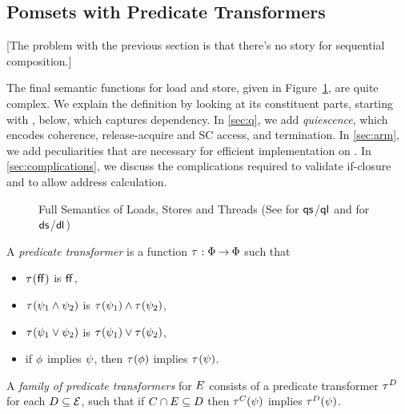 \subsection{Pomsets with Predicate Transformers}

[The problem with the previous section is that there's no story for
sequential composition.]

The final semantic functions for load and store, given in
Figure~\ref{fig:full}, are quite complex.  We explain the definition by
looking at its constituent parts, starting with
, below, which captures dependency.  In
\textsection\ref{sec:q}, we add \emph{quiescence}, which encodes coherence,
release-acquire and SC access, and termination.  In
\textsection\ref{sec:arm}, we add peculiarities that are necessary for
efficient implementation on \armeight.  In
\textsection\ref{sec:complications}, we discuss the complications required
to validate if-closure and to allow address calculation.
\begin{figure*}
  \begin{center}
    \begin{minipage}{0.905\textwidth}
      
    \end{minipage}
  \end{center}
  \caption{Full Semantics of Loads, Stores and Threads (See 
    for $\mathsf{qs}_{}^{}$/$\mathsf{ql}_{}^{}$ and  for $\DS{}{}$/$\mathsf{dl}_{}^{}$)}
  \label{fig:full}
\end{figure*}    


\begin{definition}
  A \emph{predicate transformer} is a %
  function
  $\aTr{}{}:\Formulae\fun\Formulae$ such that
  \begin{itemize}
  \item $\aTr{}{\FALSE}$ is $\mkern.6mu\mathsf{ff}\mkern.6mu$,    
  \item $\aTr{}{\bForm_1\land\bForm_2}$ is $\aTr{}{\bForm_1}\land\aTr{}{\bForm_2}$,    
  \item $\aTr{}{\bForm_1\lor\bForm_2}$ is $\aTr{}{\bForm_1}\lor\aTr{}{\bForm_2}$, 
  \item if $\phi$ implies $\psi$, then $\aTr{}{\aForm}$ implies $\aTr{}{\bForm}$.
  \end{itemize}
\end{definition}

\begin{definition}
  A \emph{family of predicate transformers} for $E$ consists of a
  predicate transformer $\aTr{\bEvs}{}$ for each $D\subseteq\mathcal{E}$,
  such that if $C \cap E \subseteq D$ then $\aTr{\cEvs}{\bForm}$
  implies $\aTr{\bEvs}{\bForm}$.
\end{definition}


